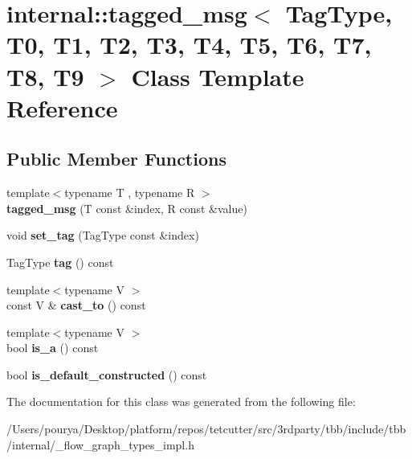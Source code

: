 \hypertarget{classinternal_1_1tagged__msg}{}\section{internal\+:\+:tagged\+\_\+msg$<$ Tag\+Type, T0, T1, T2, T3, T4, T5, T6, T7, T8, T9 $>$ Class Template Reference}
\label{classinternal_1_1tagged__msg}
\subsection*{Public Member Functions}
\begin{DoxyCompactItemize}
\item 
\hypertarget{classinternal_1_1tagged__msg_ad2ab02061b83e1d38cb4a9dc4b1dd99e}{}{\footnotesize template$<$typename T , typename R $>$ }\\{\bfseries tagged\+\_\+msg} (T const \&index, R const \&value)\label{classinternal_1_1tagged__msg_ad2ab02061b83e1d38cb4a9dc4b1dd99e}

\item 
\hypertarget{classinternal_1_1tagged__msg_ad7f128b1fbc3d56d8479abcc4764f1a8}{}void {\bfseries set\+\_\+tag} (Tag\+Type const \&index)\label{classinternal_1_1tagged__msg_ad7f128b1fbc3d56d8479abcc4764f1a8}

\item 
\hypertarget{classinternal_1_1tagged__msg_a7e7c5d4fa6ff43cd490df7390edb8795}{}Tag\+Type {\bfseries tag} () const \label{classinternal_1_1tagged__msg_a7e7c5d4fa6ff43cd490df7390edb8795}

\item 
\hypertarget{classinternal_1_1tagged__msg_ad12e2fb67f6598f2c880ce5b337bbc1e}{}{\footnotesize template$<$typename V $>$ }\\const V \& {\bfseries cast\+\_\+to} () const \label{classinternal_1_1tagged__msg_ad12e2fb67f6598f2c880ce5b337bbc1e}

\item 
\hypertarget{classinternal_1_1tagged__msg_a918ebeca99baa9393190f40e1ea13141}{}{\footnotesize template$<$typename V $>$ }\\bool {\bfseries is\+\_\+a} () const \label{classinternal_1_1tagged__msg_a918ebeca99baa9393190f40e1ea13141}

\item 
\hypertarget{classinternal_1_1tagged__msg_a3deb1c0db32e0657ddae9f596d9da69f}{}bool {\bfseries is\+\_\+default\+\_\+constructed} () const \label{classinternal_1_1tagged__msg_a3deb1c0db32e0657ddae9f596d9da69f}

\end{DoxyCompactItemize}


The documentation for this class was generated from the following file\+:\begin{DoxyCompactItemize}
\item 
/\+Users/pourya/\+Desktop/platform/repos/tetcutter/src/3rdparty/tbb/include/tbb/internal/\+\_\+flow\+\_\+graph\+\_\+types\+\_\+impl.\+h\end{DoxyCompactItemize}
